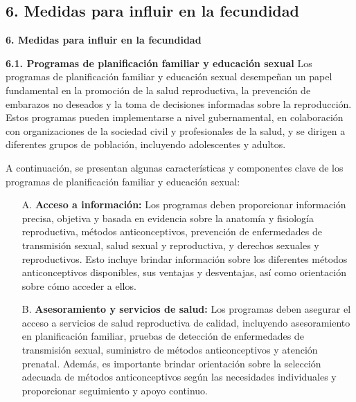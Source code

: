 \documentclass[8pt,a4paper]{beamer}
\begin{document}
{\subsection{6. Medidas para influir en la fecundidad}
\begin{frame}{\textbf{6. Medidas para influir en la fecundidad}}
\begin{block}{\textbf{6.1. Programas de planificación familiar y educación sexual}}
\setlength{\parskip}{3px}
\justifying
Los programas de planificación familiar y educación sexual desempeñan un papel fundamental en la promoción de la salud reproductiva, la prevención de embarazos no deseados y la toma de decisiones informadas sobre la reproducción. Estos programas pueden implementarse a nivel gubernamental, en colaboración con organizaciones de la sociedad civil y profesionales de la salud, y se dirigen a diferentes grupos de población, incluyendo adolescentes y adultos.

A continuación, se presentan algunas características y componentes clave de los programas de planificación familiar y educación sexual:
\begin{enumerate}
\setlength{\parskip}{3px}
\justifying
\item[A.] \textbf{Acceso a información:} Los programas deben proporcionar información precisa, objetiva y basada en evidencia sobre la anatomía y fisiología reproductiva, métodos anticonceptivos, prevención de enfermedades de transmisión sexual, salud sexual y reproductiva, y derechos sexuales y reproductivos. Esto incluye brindar información sobre los diferentes métodos anticonceptivos disponibles, sus ventajas y desventajas, así como orientación sobre cómo acceder a ellos.

\end{enumerate}
\end{block}
\end{frame}

\begin{frame}{}
\begin{block}{}
\setlength{\parskip}{3px}
\justifying

\begin{enumerate}
\setlength{\parskip}{3px}
\justifying
\item[B.] \textbf{Asesoramiento y servicios de salud:} Los programas deben asegurar el acceso a servicios de salud reproductiva de calidad, incluyendo asesoramiento en planificación familiar, pruebas de detección de enfermedades de transmisión sexual, suministro de métodos anticonceptivos y atención prenatal. Además, es importante brindar orientación sobre la selección adecuada de métodos anticonceptivos según las necesidades individuales y proporcionar seguimiento y apoyo continuo.


\end{enumerate}
\end{block}
\end{frame}}
\end{document}
